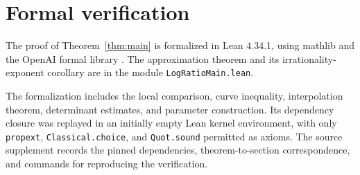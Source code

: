 \section{Formal verification}\label{sec:verification}

The proof of Theorem~\ref{thm:main} is formalized in Lean 4.34.1,
using mathlib and the OpenAI formal library \cite{OAIpi}.
The approximation theorem and its irrationality-exponent corollary
are in the module \texttt{LogRatioMain.lean}.

The formalization includes the local comparison, curve inequality,
interpolation theorem, determinant estimates, and parameter construction.
Its dependency closure was replayed in an initially empty Lean kernel
environment, with only \texttt{propext}, \texttt{Classical.choice}, and
\texttt{Quot.sound} permitted as axioms. The source supplement records
the pinned dependencies, theorem-to-section correspondence, and
commands for reproducing the verification.
